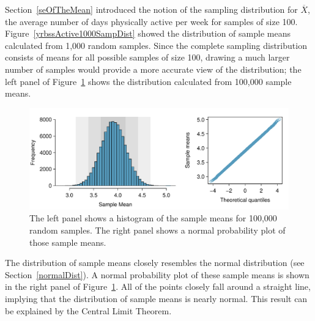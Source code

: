 \begin{spacing}{1.5}
Section~\ref{seOfTheMean} introduced the notion of the sampling distribution for $\overline{X}$, the average number of days physically active per week for samples of size 100. Figure~\ref{yrbssActive1000SampDist} showed the distribution of sample means calculated from 1,000 random samples. Since the complete sampling distribution consists of means for all possible samples of size 100, drawing a much larger number of samples would provide a more accurate view of the distribution; the left panel of Figure~\ref{yrbssActiveBigSampDist} shows the distribution calculated from 100,000 sample means. 

\begin{figure}[hht]
   \centering
   \includegraphics[width=\textwidth]
{ch_inference_foundations_oi_biostat/figures/yrbssActiveBigSampDist/yrbssActiveBigSampDist}
   \caption{The left panel shows a histogram of the sample means for 100,000 random samples. The right panel shows a normal probability plot of those sample means.}
   \label{yrbssActiveBigSampDist}
\end{figure}


The distribution of sample means closely resembles the normal distribution (see Section~\ref{normalDist}). A normal probability plot of these sample means is shown in the right panel of Figure~\ref{yrbssActiveBigSampDist}. All of the points closely fall around a straight line, implying that the distribution of sample means is nearly normal. This result can be explained by the Central Limit Theorem.

\end{spacing}
